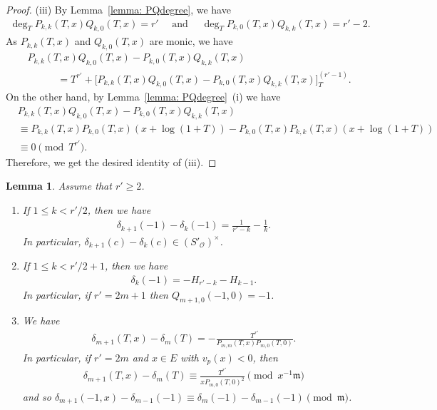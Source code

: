 \documentclass[11pt]{amsart}
\theoremstyle{definition}
\numberwithin{equation}{subsection}
\theoremstyle{plain}
\theoremstyle{plain}
\theoremstyle{plain}
\theoremstyle{plain}
\theoremstyle{plain}
\theoremstyle{plain}
\theoremstyle{plain}
\theoremstyle{plain}
\theoremstyle{plain}
\newtheorem{lemm}[equation]{Lemma}
\theoremstyle{plain}
\theoremstyle{plain}
\theoremstyle{plain}
\theoremstyle{definition}
\theoremstyle{definition}
\theoremstyle{definition}
\theoremstyle{remark}
\renewcommand{\(}{\textup{(}}
\renewcommand{\)}{\textup{)}}
\newcommand{\fm}{\mathfrak{m}}
\newcommand{\cO}{\mathcal{O}}
\begin{document}
\begin{proof}
(iii) By Lemma~\ref{lemma: PQdegree}, we have
    \begin{align*}
        \deg_T P_{k,k}(T,x)Q_{k,0}(T,x)=r'\quad\mbox{ and }\quad\deg_T P_{k,0}(T,x)Q_{k,k}(T,x)=r'-2.
    \end{align*}
As $P_{k,k}(T,x)$ and $Q_{k,0}(T,x)$ are monic, we have
    \begin{align*}
        &P_{k,k}(T,x)Q_{k,0}(T,x)-P_{k,0}(T,x)Q_{k,k}(T,x)
        \\&\hspace{3em}
        =
        T^{r'}+\big[P_{k,k}(T,x)Q_{k,0}(T,x)-P_{k,0}(T,x)Q_{k,k}(T,x)\big]_{T}^{(r'-1)}.
    \end{align*}
On the other hand, by Lemma~\ref{lemma: PQdegree}~(i) we have
    \begin{align*}
        &P_{k,k}(T,x)Q_{k,0}(T,x)-P_{k,0}(T,x)Q_{k,k}(T,x)
        \\&
        \equiv
        P_{k,k}(T,x)P_{k,0}(T,x)(x+\log(1+T))-P_{k,0}(T,x)P_{k,k}(T,x)(x+\log(1+T))
        \\&
        \equiv 0 \pmod{T^{r'}}.
    \end{align*}
Therefore, we get the desired identity of (iii).
\end{proof}




\begin{lemm}\label{lemma-delta}
Assume that $r'\geq 2$.
\begin{enumerate}[leftmargin=*]
  \item If $1\leq k<r'/2$, then we have
  \begin{align*}
    \delta_{k+1}(-1)-\delta_k(-1)=\frac{1}{r'-k}-\frac{1}{k}.
  \end{align*}
  In particular, $\delta_{k+1}(c)-\delta_k(c)\in(S'_\cO)^\times$.
  \item If $1\leq k<r'/2+1$, then we have
  \begin{align*}
    \delta_k(-1)=-H_{r'-k}-H_{k-1}.
  \end{align*}
 In particular, if $r'=2m+1$ then $Q_{m+1,0}(-1,0)=-1$.
  \item We have
    \begin{align*}
        \delta_{m+1}(T,x)-\delta_m(T) =-\frac{T^{r'}}{P_{m,m}(T,x)P_{m,0}(T,0)}.
    \end{align*}
    In particular, if $r'=2m$ and $x\in E$ with $v_p(x)<0$, then
    \begin{align*}
        \delta_{m+1}(T,x)-\delta_m(T)
        \equiv
        \frac{T^{r'}}{xP_{m,0}(T,0)^2}
        \pmod{x^{-1}\fm}
    \end{align*}
    and so $\delta_{m+1}(-1,x)-\delta_{m-1}(-1)\equiv\delta_m(-1)-\delta_{m-1}(-1)\pmod{\fm}$.
  \end{enumerate}
\end{lemm}
\end{document}
